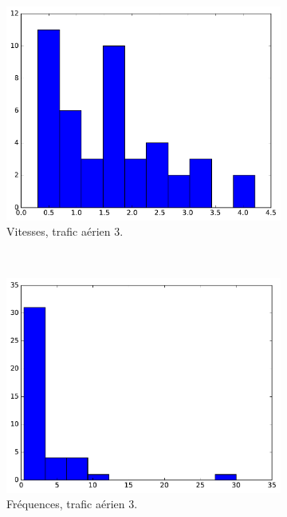 \begin{appendices}
	\begin{figure}[htbp]
		\begin{subfigure}[t]{\subImgWclicks}
			\centering
			\includegraphics[width=\textwidth]{figures/ch3/hkg_filteredSpeed}
			\caption{Vitesses, trafic aérien 3.}
			\label{fig:hkg_filteredSpeed}
		\end{subfigure}
		~
		\begin{subfigure}[t]{\subImgWclicks}
			\centering
			\includegraphics[width=\textwidth]{figures/ch3/hkg_frequency}
			\caption{Fréquences, trafic aérien 3.}
			\label{fig:hkg_frequency}
		\end{subfigure}
		~
		\begin{subfigure}[t]{\subImgWclicks}

\end{subfigure}
\end{figure}
\end{appendices}
